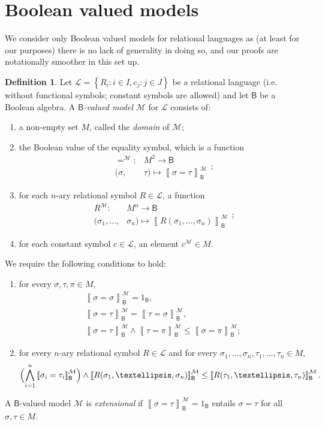 \documentclass[11pt]{amsart}
\newcommand{\LL}{\mathcal{L}}
\theoremstyle{plain}
\theoremstyle{definition}
\newtheorem{definition}[theorem]{Definition}
\theoremstyle{plain}
\theoremstyle{remark}
\newcommand{\M}{\mathcal{M}}
\newcommand{\bool}[1]{\mathsf{#1}}
\newcommand{\Qp}[1]{\left\llbracket #1 \right\rrbracket}
\newcommand{\bp}[1]{\left\lbrace #1 \right\rbrace}
\newcommand{\0}{\mathsf{0}}
\renewcommand{\1}{\mathsf{1}}
\renewcommand{\2}{\mathsf{2}}
\theoremstyle{definition}
\begin{document}
\section{Boolean valued models}\label{sec:boolvalmod}
We consider only Boolean valued models for relational languages as (at least for our purposes) there is no lack of generality in doing so, and our proofs are notationally smoother in this set up.
\begin{definition}\label{def:boolvalmod}
Let $\LL=\bp{R_i: i\in I, c_j: j\in J}$ be a relational language (i.e. without functional symbols; constant symbols are allowed) and let $\bool{B}$ be a Boolean algebra. A \emph{$\bool{B}$-valued model} $\M$ for $\LL$ consists of:
\begin{enumerate}
\item a non-empty set $M$, called the \emph{domain} of $\M$;
\item the Boolean value of the equality symbol, which is a function
\[
\begin{aligned}
=^\M:&M^2\to\bool{B}\\
(\sigma,& \tau)\mapsto\Qp{\sigma=\tau}^\M_{\bool{B}}
\end{aligned};
\]
\item for each $n$-ary relational symbol $R\in\LL$, a function
\[
\begin{aligned}
R^\M:&M^n\to\bool{B}\\
(\sigma_1, \dots,& \sigma_n)\mapsto\Qp{R(\sigma_1, \dots, \sigma_n)}^\M_{\bool{B}}
\end{aligned};
\]
\item for each constant symbol $c\in\LL$, an element $c^\M\in M$.
\end{enumerate}
We require the following conditions to hold:
\begin{enumerate}
\item for every $\sigma, \tau, \pi\in M$,
\[
\begin{gathered}
\Qp{\sigma=\sigma}^\M_{\bool{B}}=1_{\bool{B}},\\
\Qp{\sigma=\tau}^\M_{\bool{B}}=\Qp{\tau=\sigma}^\M_{\bool{B}},\\
\Qp{\sigma=\tau}^\M_{\bool{B}}\wedge\Qp{\tau=\pi}^\M_{\bool{B}}\leq\Qp{\sigma=\pi}^\M_{\bool{B}};
\end{gathered}
\]
\item for every $n$-ary relational symbol $R\in\LL$ and for every $\sigma_1, \dots, \sigma_n, \tau_1, \dots, \tau_n\in M$,
\[
\Bigl(\bigwedge_{i=1}^n\Qp{\sigma_i=\tau_i}^\M_{\bool{B}}\Bigr)\wedge\Qp{R(\sigma_1, \dots, \sigma_n)}^\M_{\bool{B}}\leq\Qp{R(\tau_1, \dots, \tau_n)}^\M_{\bool{B}}.
\]
\end{enumerate}
A $\bool{B}$-valued model $\M$ is \emph{extensional} if $\Qp{\sigma=\tau}^\M_{\bool{B}}=1_{\bool{B}}$ entails $\sigma=\tau$ for all $\sigma, \tau\in M$.
\end{definition}
\end{document}
